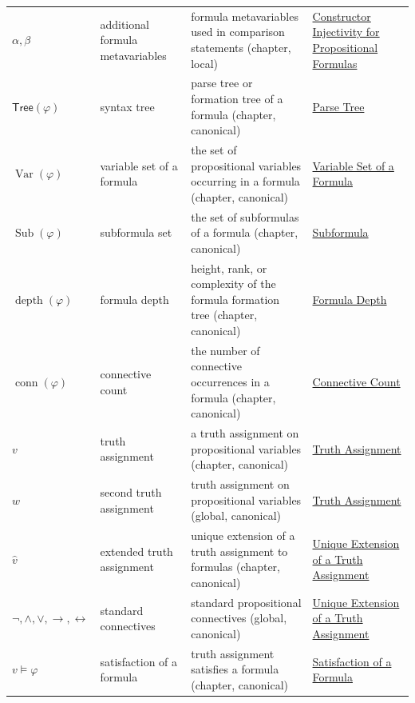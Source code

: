 \begin{longtable}{p{}p{}p{}p{}}
\(\alpha,\beta\) & additional formula metavariables & formula metavariables used in comparison statements (chapter, local) & \hyperref[lem:constructor-injectivity-propositional-formulas]{Constructor Injectivity for Propositional Formulas}\\
\(\mathsf{Tree}(\varphi)\) & syntax tree & parse tree or formation tree of a formula (chapter, canonical) & \hyperref[def:parse-tree-propositional-logic]{Parse Tree}\\
\(\operatorname{Var}(\varphi)\) & variable set of a formula & the set of propositional variables occurring in a formula (chapter, canonical) & \hyperref[def:formula-variable-set-propositional-logic]{Variable Set of a Formula}\\
\(\operatorname{Sub}(\varphi)\) & subformula set & the set of subformulas of a formula (chapter, canonical) & \hyperref[def:subformula-propositional-logic]{Subformula}\\
\(\operatorname{depth}(\varphi)\) & formula depth & height, rank, or complexity of the formula formation tree (chapter, canonical) & \hyperref[def:formula-depth-propositional-logic]{Formula Depth}\\
\(\operatorname{conn}(\varphi)\) & connective count & the number of connective occurrences in a formula (chapter, canonical) & \hyperref[def:connective-count-propositional-logic]{Connective Count}\\
\(v\) & truth assignment & a truth assignment on propositional variables (chapter, canonical) & \hyperref[def:truth-assignment-propositional-logic]{Truth Assignment}\\
\(w\) & second truth assignment & truth assignment on propositional variables (global, canonical) & \hyperref[def:truth-assignment-propositional-logic]{Truth Assignment}\\
\(\widehat v\) & extended truth assignment & unique extension of a truth assignment to formulas (chapter, canonical) & \hyperref[thm:unique-extension-truth-assignment-propositional-logic]{Unique Extension of a Truth Assignment}\\
\(\neg,\land,\lor,\to,\leftrightarrow\) & standard connectives & standard propositional connectives (global, canonical) & \hyperref[thm:unique-extension-truth-assignment-propositional-logic]{Unique Extension of a Truth Assignment}\\
\(v\models\varphi\) & satisfaction of a formula & truth assignment satisfies a formula (chapter, canonical) & \hyperref[def:satisfaction-propositional-formula]{Satisfaction of a Formula}\\

\end{longtable}

